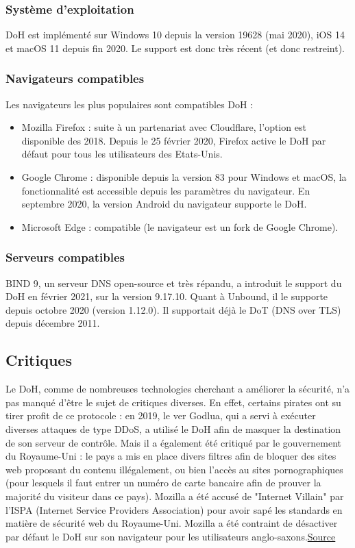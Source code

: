\documentclass[a4paper,12pt]{article}
\begin{document}
	\subsubsection{Système d'exploitation}
	DoH est implémenté sur Windows 10 depuis la version 19628 (mai 2020), iOS 14 et macOS 11 depuis fin 2020. Le support est donc très récent (et donc restreint).
	\subsubsection{Navigateurs compatibles}
	Les navigateurs les plus populaires sont compatibles DoH :
	\begin{itemize}
		\item Mozilla Firefox : suite à un partenariat avec Cloudflare, l'option est disponible des 2018. Depuis le 25 février 2020, Firefox active le DoH par défaut pour tous les utilisateurs des Etats-Unis.
		\item Google Chrome : disponible depuis la version 83 pour Windows et macOS, la fonctionnalité est accessible depuis les paramètres du navigateur. En septembre 2020, la version Android du navigateur supporte le DoH.
		\item Microsoft Edge : compatible (le navigateur est un fork de Google Chrome).
	\end{itemize}
	\subsubsection{Serveurs compatibles}
	BIND 9, un serveur DNS open-source et très répandu, a introduit le support du DoH en février 2021, sur la version 9.17.10.
	Quant à Unbound, il le supporte depuis octobre 2020 (version 1.12.0). Il supportait déjà le DoT (DNS over TLS) depuis décembre 2011.
	\subsection{Critiques}
	Le DoH, comme de nombreuses technologies cherchant a améliorer la sécurité, n'a pas manqué d'être le sujet de critiques diverses. En effet, certains pirates ont su tirer profit de ce protocole : en 2019, le ver Godlua, qui a servi à exécuter diverses attaques de type DDoS, a utilisé le DoH afin de masquer la destination de son serveur de contrôle.
	Mais il a également été critiqué par le gouvernement du Royaume-Uni : le pays a mis en place divers filtres afin de bloquer des sites web proposant du contenu illégalement, ou bien l'accès au sites pornographiques (pour lesquels il faut entrer un numéro de carte bancaire afin de prouver la majorité du visiteur dans ce pays). Mozilla a été accusé de "Internet Villain" par l'ISPA (Internet Service Providers Association) pour avoir sapé les standards en matière de sécurité web du Royaume-Uni. Mozilla a été contraint de désactiver par défaut le DoH sur son navigateur pour les utilisateurs anglo-saxons.\href{https://www.theguardian.com/technology/2019/sep/24/firefox-no-uk-plans-to-make-encrypted-browser-tool-its-default}{Source}
\end{document}
